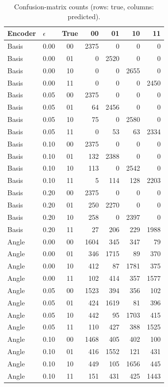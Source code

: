 \begin{table}[htbp]
\centering
\small
\caption{Confusion-matrix counts (rows: true, columns: predicted).}
\label{tab:confusion}
\begin{tabular}{llcrrrr}
\toprule
Encoder & $\epsilon$ & True & 00 & 01 & 10 & 11 \\
\midrule
Basis & 0.00 & 00 & 2375 & 0 & 0 & 0 \\
Basis & 0.00 & 01 & 0 & 2520 & 0 & 0 \\
Basis & 0.00 & 10 & 0 & 0 & 2655 & 0 \\
Basis & 0.00 & 11 & 0 & 0 & 0 & 2450 \\
Basis & 0.05 & 00 & 2375 & 0 & 0 & 0 \\
Basis & 0.05 & 01 & 64 & 2456 & 0 & 0 \\
Basis & 0.05 & 10 & 75 & 0 & 2580 & 0 \\
Basis & 0.05 & 11 & 0 & 53 & 63 & 2334 \\
Basis & 0.10 & 00 & 2375 & 0 & 0 & 0 \\
Basis & 0.10 & 01 & 132 & 2388 & 0 & 0 \\
Basis & 0.10 & 10 & 113 & 0 & 2542 & 0 \\
Basis & 0.10 & 11 & 5 & 114 & 128 & 2203 \\
Basis & 0.20 & 00 & 2375 & 0 & 0 & 0 \\
Basis & 0.20 & 01 & 250 & 2270 & 0 & 0 \\
Basis & 0.20 & 10 & 258 & 0 & 2397 & 0 \\
Basis & 0.20 & 11 & 27 & 206 & 229 & 1988 \\
\midrule
Angle & 0.00 & 00 & 1604 & 345 & 347 & 79 \\
Angle & 0.00 & 01 & 346 & 1715 & 89 & 370 \\
Angle & 0.00 & 10 & 412 & 87 & 1781 & 375 \\
Angle & 0.00 & 11 & 102 & 414 & 357 & 1577 \\
Angle & 0.05 & 00 & 1523 & 394 & 356 & 102 \\
Angle & 0.05 & 01 & 424 & 1619 & 81 & 396 \\
Angle & 0.05 & 10 & 442 & 95 & 1703 & 415 \\
Angle & 0.05 & 11 & 110 & 427 & 388 & 1525 \\
Angle & 0.10 & 00 & 1468 & 405 & 402 & 100 \\
Angle & 0.10 & 01 & 416 & 1552 & 121 & 431 \\
Angle & 0.10 & 10 & 449 & 105 & 1656 & 445 \\
Angle & 0.10 & 11 & 151 & 431 & 425 & 1443 \\

\end{tabular}
\end{table}
